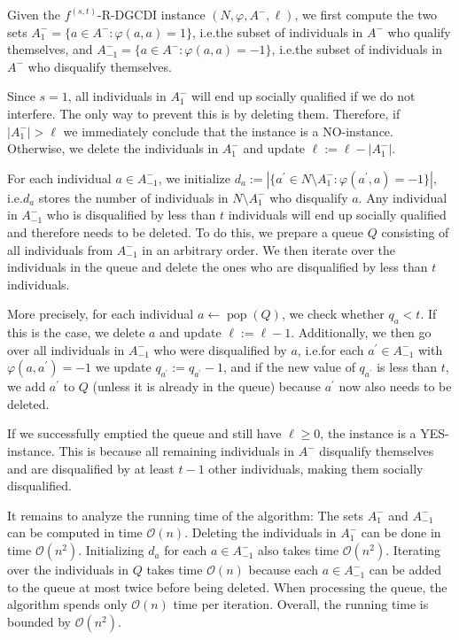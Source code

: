 \documentclass[
    12pt,               %
    a4paper,            %
    bibtotoc,           %
    pointlessnumbers,   %
    ngerman,            %
    titlepage,          %
    leqno,              %
    ]{scrarticle}       %
\begin{document}
\begin{Proof}
Given the $f^{(s, t)}$-R-DGCDI instance $(N, \varphi, A^-, \ell)$, we first compute the two sets $A^-_{1} = \{ a \in A^- : \varphi(a, a) = 1 \}$, i.e.\@ the subset of individuals in $A^-$ who qualify themselves, and $A^-_{-1} = \{ a \in A^- : \varphi(a, a) = -1 \}$, i.e.\@ the subset of individuals in $A^-$ who disqualify themselves.

Since $s=1$, all individuals in $A^-_{1}$ will end up socially qualified if we do not interfere. The only way to prevent this is by deleting them. Therefore, if $|A^-_{1}| > \ell$ we immediately conclude that the instance is a NO-instance. Otherwise, we delete the individuals in $A^-_{1}$ and update $\ell := \ell - |A^-_{1}|$.

For each individual $a \in A^-_{-1}$, we initialize $d_a := |\{ a^\prime \in N \setminus A^-_{1} : \varphi(a^\prime, a) = -1 \}|$, i.e.\@ $d_a$ stores the number of individuals in $N \setminus A^-_{1}$ who disqualify $a$. Any individual in $A^-_{-1}$ who is disqualified by less than $t$ individuals will end up socially qualified and therefore needs to be deleted. To do this, we prepare a queue $Q$ consisting of all individuals from $A^-_{-1}$ in an arbitrary order. We then iterate over the individuals in the queue and delete the ones who are disqualified by less than $t$ individuals.

More precisely, for each individual $a \leftarrow \operatorname{pop}(Q)$, we check whether $q_a < t$. If this is the case, we delete $a$ and update $\ell := \ell - 1$. Additionally, we then go over all individuals in $A^-_{-1}$ who were disqualified by $a$, i.e.\@ for each $a^\prime \in A^-_{-1}$ with $\varphi(a, a^\prime) = -1$ we update $q_{a^\prime} := q_{a^\prime} - 1$, and if the new value of $q_{a^\prime}$ is less than $t$, we add $a^\prime$ to $Q$ (unless it is already in the queue) because $a^\prime$ now also needs to be deleted.

If we successfully emptied the queue and still have $\ell \geq 0$, the instance is a YES-instance. This is because all remaining individuals in $A^-$ disqualify themselves and are disqualified by at least $t-1$ other individuals, making them socially disqualified.

It remains to analyze the running time of the algorithm: The sets $A^-_{1}$ and $A^-_{-1}$ can be computed in time $\mathcal{O}(n)$. Deleting the individuals in $A^-_{1}$ can be done in time $\mathcal{O}(n^2)$. Initializing $d_a$ for each $a \in A^-_{-1}$ also takes time $\mathcal{O}(n^2)$. Iterating over the individuals in $Q$ takes time $\mathcal{O}(n)$ because each $a \in A^-_{-1}$ can be added to the queue at most twice before being deleted. When processing the queue, the algorithm spends only $\mathcal{O}(n)$ time per iteration. Overall, the running time is bounded by $\mathcal{O}(n^2)$.
\end{Proof}
\end{document}
